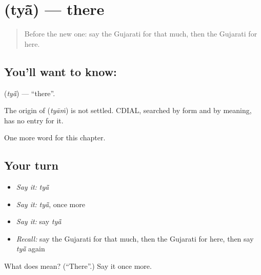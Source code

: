 \section[\texorpdfstring{\gu{ત્યાં} (tyā̃)}{ત્યાં (tyā̃)}]{ (tyā̃) — there}

\label{lesson:GU-C101-tya}



\begin{quote}
Before the new one: say the Gujarati for that much, then the Gujarati for here.
\end{quote}

\subsection*{You'll want to know: }
\textbf{} (\emph{tyā̃}) — \textquotedblleft{}there\textquotedblright{}.

\begin{cousinweb}
The origin of \textbf{} (\emph{tyāṁ}) is not settled. CDIAL, searched by form and by meaning, has no entry for it.
\end{cousinweb}

\begin{grammarlens}[title={What you've built}]
One more word for this chapter.
\end{grammarlens}

\subsection*{Your turn}
\begin{itemize}
\raggedright
  \item \emph{Say it:} \emph{tyā̃}
  \item \emph{Say it:} \emph{tyā̃}, once more
  \item \emph{Say it:} say \emph{tyā̃}
  \item \emph{Recall:} say the Gujarati for that much, then the Gujarati for here, then say \emph{tyā̃} again
\end{itemize}

\begin{tcolorbox}[breakable,colback=teal!4,colframe=teal!35!black,title={Before you move on}]
What does  mean? (\textquotedblleft{}There\textquotedblright{}.) Say it once more.
\end{tcolorbox}

